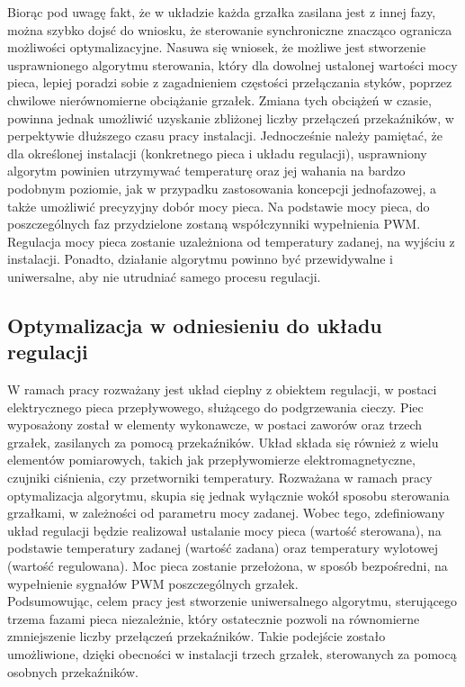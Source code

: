 \documentclass[a4paper,twoside,12pt]{book}
\begin{document}
\newpage
Biorąc pod uwagę fakt, że w układzie każda grzałka zasilana jest z innej fazy, można szybko dojsć do wniosku, że sterowanie synchroniczne znacząco ogranicza możliwości optymalizacyjne. Nasuwa się wniosek, że możliwe jest stworzenie usprawnionego algorytmu sterowania, który dla dowolnej ustalonej wartości mocy pieca, lepiej poradzi sobie z zagadnieniem częstości przełączania styków, poprzez chwilowe nierównomierne obciążanie grzałek. Zmiana tych obciążeń w czasie, powinna jednak umożliwić uzyskanie zbliżonej liczby przełączeń przekaźników, w perpektywie dłuższego czasu pracy instalacji. Jednocześnie należy pamiętać, że dla określonej instalacji (konkretnego pieca i układu regulacji), usprawniony algorytm powinien utrzymywać temperaturę oraz jej wahania na bardzo podobnym poziomie, jak w przypadku zastosowania koncepcji jednofazowej, a także umożliwić precyzyjny dobór mocy pieca. Na podstawie mocy pieca, do poszczególnych faz przydzielone zostaną współczynniki wypełnienia PWM. Regulacja mocy pieca zostanie uzależniona od temperatury zadanej, na wyjściu z instalacji. Ponadto, działanie algorytmu powinno być przewidywalne i uniwersalne, aby nie utrudniać samego procesu regulacji.\\

\subsection{Optymalizacja w odniesieniu do układu regulacji}
W ramach pracy rozważany jest układ cieplny z obiektem regulacji, w postaci elektrycznego pieca przepływowego, służącego do podgrzewania cieczy. Piec wyposażony został w elementy wykonawcze, w postaci zaworów oraz trzech grzałek, zasilanych za pomocą przekaźników. Układ składa się również z wielu elementów pomiarowych, takich jak przepływomierze elektromagnetyczne, czujniki ciśnienia, czy przetworniki temperatury. Rozważana w ramach pracy optymalizacja algorytmu, skupia się jednak wyłącznie wokół sposobu sterowania grzałkami, w zależności od parametru mocy zadanej. Wobec tego, zdefiniowany układ regulacji będzie realizował ustalanie mocy pieca (wartość sterowana), na podstawie temperatury zadanej (wartość zadana) oraz temperatury wylotowej (wartość regulowana). Moc pieca zostanie przełożona, w sposób bezpośredni, na wypełnienie sygnałów PWM poszczególnych grzałek.\\

Podsumowując, celem pracy jest stworzenie uniwersalnego algorytmu, sterującego trzema fazami pieca niezależnie, który ostatecznie pozwoli na równomierne zmniejszenie liczby przełączeń przekaźników. Takie podejście zostało umożliwione, dzięki obecności w instalacji trzech grzałek, sterowanych za pomocą osobnych przekaźników.
\end{document}
